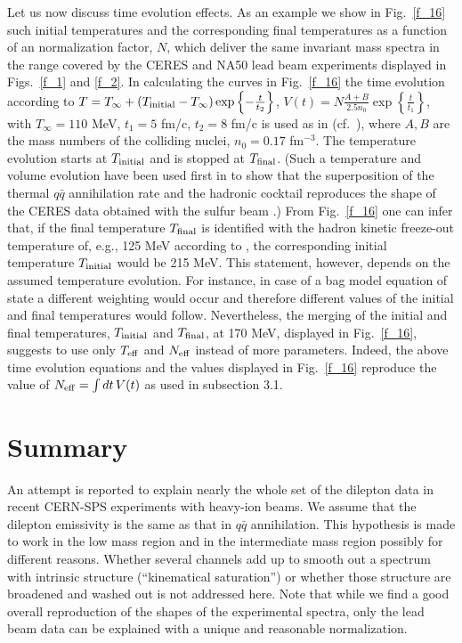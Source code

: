 Let us now discuss time evolution effects.
As an example we show in Fig.~\ref{f_16} such initial temperatures
and the corresponding final temperatures as a function of an 
normalization factor, $N$, 
which deliver the same invariant mass spectra in the range
covered by the CERES and NA50 lead beam experiments displayed in
Figs.~\ref{f_1} and \ref{f_2}. 
In calculating the curves in Fig.~\ref{f_16}
the time evolution according to
$T = T_\infty + (T_{\rm initial} - T_\infty) 
\exp \left\{ - \frac{t}{t_2}\right\}$,
$V(t) = N \frac{A + B}{2.5 n_0} \exp \left\{ \frac{t}{t_1}\right\}$,
with 
$T_\infty = 110$ MeV, $t_1 = 5$ fm/c, $t_2 = 8$ fm/c
is used as in \cite{Phys.Lett.}
(cf.\ \cite{KlinglWeise}), 
where $A, B$ are the mass numbers of the
colliding nuclei, $n_0 = 0.17$ fm${}^{-3}$.
The temperature evolution starts at $T_{\rm initial}$ and is stopped
at $T_{\rm final}$.
(Such a temperature and volume evolution have been used first
in \cite{Klingl_Weise} to show that the superposition of the 
thermal $q \bar q$ annihilation rate and the hadronic cocktail
reproduces the shape of the CERES data obtained with the sulfur beam 
\cite{CERES_S}.)
From Fig.~\ref{f_16} one can infer that, if the final temperature 
$T_{\rm final}$ is
identified with the hadron kinetic freeze-out temperature of, e.g.,
125 MeV according to \cite{J.Phys.}, the corresponding initial temperature
$T_{\rm initial}$
would be 215 MeV. This statement, however, depends on the
assumed temperature evolution. For instance, in case of a bag model 
equation of state a different weighting would occur and therefore
different values of the initial and final temperatures would follow.
Nevertheless, the merging of the initial and final temperatures,
$T_{\rm initial}$ and $T_{\rm final}$, 
at 170 MeV, displayed in Fig.~\ref{f_16}, suggests to use only
$T_{\rm eff}$ and $N_{\rm eff}$ instead of more parameters.
Indeed, the above time evolution equations and the values displayed in
Fig.~\ref{f_16} reproduce the value of $N_{\rm eff} = \int dt \, V(t)$
as used in subsection 3.1.

\section{Summary} %

An attempt is reported to explain nearly the whole set of
the dilepton data in recent CERN-SPS
experiments with heavy-ion beams. 
We assume that the dilepton emissivity is the same as that in 
$q \bar q$ annihilation.
This hypothesis is made to work in the low mass region and in the
intermediate mass region possibly for different reasons. Whether
several channels add up to smooth out a spectrum with intrinsic
structure (``kinematical saturation'') or whether those structure are
broadened and washed out is not addressed here. 
Note that 
while we find a good overall reproduction of the shapes of the experimental
spectra, only the lead beam data can be explained with a unique and reasonable
normalization.

